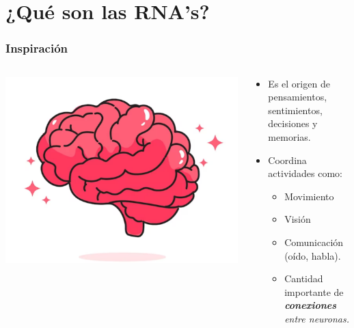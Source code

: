 
\section{¿Qué son las RNA's?} %


\begin{frame}
	\frametitle{Inspiración}
	
	    \begin{columns}
		
		\begin{column}{0.5\textwidth} %
			\includegraphics[width=\textwidth]{img/cerebro.png} %
		\end{column}
		
		\begin{column}{0.5\textwidth} %
			\begin{itemize}
				\item Es el origen de pensamientos, sentimientos, decisiones y memorias.
				\item Coordina actividades como:
				\begin{itemize}
					\item Movimiento
					\item Visión
					\item Comunicación (oído, habla).
					\item Cantidad importante de \textit{\textbf{conexiones} entre neuronas.}
				\end{itemize}
			\end{itemize}
		\end{column}
	\end{columns}
\end{frame}

